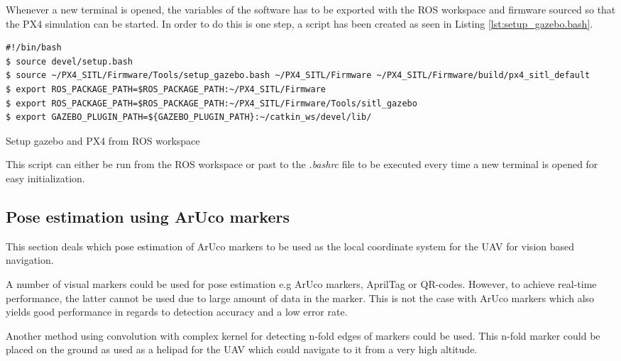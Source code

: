 \documentclass[../Head/report.tex]{subfiles}
\begin{document}
Whenever a new terminal is opened, the variables of the software has to be exported with the ROS workspace and firmware sourced so that the PX4 simulation can be started. In order to do this is one step, a script has been created as seen in Listing \ref{lst:setup_gazebo.bash}. 

\begin{listing}[H] 
\begin{tcolorbox}[
    enhanced,
    attach boxed title to top left={xshift=6mm,yshift=-3mm},
    colback=lightgreen!20,
    colframe=lightgreen,
    fonttitle=\bfseries\color{black},
]
\begin{verbatim}
#!/bin/bash
$ source devel/setup.bash
$ source ~/PX4_SITL/Firmware/Tools/setup_gazebo.bash ~/PX4_SITL/Firmware ~/PX4_SITL/Firmware/build/px4_sitl_default
$ export ROS_PACKAGE_PATH=$ROS_PACKAGE_PATH:~/PX4_SITL/Firmware
$ export ROS_PACKAGE_PATH=$ROS_PACKAGE_PATH:~/PX4_SITL/Firmware/Tools/sitl_gazebo
$ export GAZEBO_PLUGIN_PATH=${GAZEBO_PLUGIN_PATH}:~/catkin_ws/devel/lib/
\end{verbatim}
\end{tcolorbox}
\caption{Setup gazebo and PX4 from ROS workspace}
\label{lst:setup_gazebo.bash}    
\end{listing}  

This script can either be run from the ROS workspace or past to the \textit{.bashrc} file to be executed every time a new terminal is opened for easy initialization. 


\subsection{Pose estimation using ArUco markers}
\label{sec:pose_estimation_using_aruco_markers}

This section deals which pose estimation of ArUco markers to be used as the local coordinate system for the UAV for vision based navigation. 

A number of visual markers could be used for pose estimation e.g ArUco markers, AprilTag or QR-codes. However, to achieve real-time performance, the latter cannot be used due to large amount of data in the marker. This is not the case with ArUco markers which also yields good performance in regards to detection accuracy and a low error rate. \cite{visualmarkers} 

Another method using convolution with complex kernel for detecting n-fold edges of markers could be used.\cite{nFoldMarkers} This n-fold marker could be placed on the ground as used as a helipad for the UAV which could navigate to it from a very high altitude.  
\end{document}
